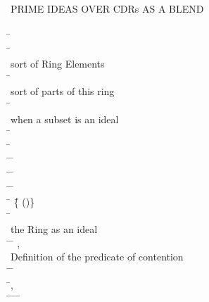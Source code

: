 \begin{hetcasl}
 \\
\\
 \\
{\small{}\KW{\%\%}PRIME IDEAS OVER CDR\Ax{-}s AS A BLEND}\\
\\
\SPEC \= \Ax{=}\\
\> \SORT \=\\
\>\> {\small{}\KW{\%\%} sort of Ring Elements}\\
\> \SORT \=\\
\>\> {\small{}\KW{\%\%} sort of parts of this ring}\\
\> \PRED \= \Ax{:} \\
\>\> {\small{}\KW{\%\%} when a subset is an ideal}\\
\> \OP \= \Ax{:} \\
\> \OP \= \Ax{:} \\
\> \OP \=\Ax{\_\_}\Ax{*}\Ax{\_\_} \Ax{:} \= \Ax{\times}  \Ax{\rightarrow} \\
\> \OP \=\Ax{\_\_}\Ax{+}\Ax{\_\_} \Ax{:} \= \Ax{\times}  \Ax{\rightarrow} \\
\> \PRED \=\Ax{\_\_}\Ax{\_\_} \Ax{:} \= \Ax{\times} \\
\> \SORT \= \Ax{=} \=\{ \Ax{:}  \Ax{\bullet} ()\}\\
\> \OP \= \Ax{:} \\
\>\> {\small{}\KW{\%\%} the Ring as an ideal}\\
\> \OP \=\Ax{\_\_}\Ax{**}\Ax{\_\_} \Ax{:} \= \Ax{\times}  \Ax{\rightarrow} ,  \\
\>\> {\small{}\KW{\%\%}Definition of the predicate of contention}\\
\> \PRED \=\Ax{\_\_}\Ax{\_\_} \Ax{:} \= \Ax{\times} \\
\> \Ax{\forall} \=,  \Ax{:}  \\
\> \Ax{\bullet} \=   \Ax{\Leftrightarrow} \=\Ax{\forall}  \Ax{:}  \Ax{\bullet} \=   \Ax{\Rightarrow} \=  \\
\> \\

\end{hetcasl}
